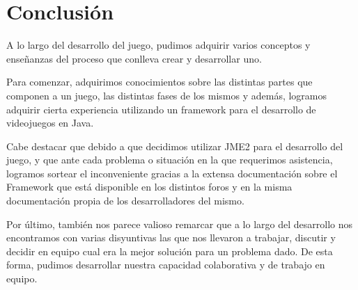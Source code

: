 \documentclass[a4paper,10pt]{article}
\begin{document}
\section{Conclusi\'on}
\label{conclusiones}

A lo largo del desarrollo del juego, pudimos adquirir varios conceptos y
ense\~nanzas del proceso que conlleva crear y desarrollar uno.

Para comenzar, adquirimos conocimientos sobre las distintas partes que componen
a un juego, las distintas fases de los mismos y adem\'as, logramos adquirir
cierta experiencia utilizando un framework para el desarrollo de videojuegos en
Java.

Cabe destacar que debido a que decidimos utilizar JME2 para el
desarrollo
del juego, y que ante cada problema o situaci\'on en la que
requerimos asistencia,
logramos
sortear el inconveniente gracias a la extensa documentaci\'on sobre el Framework
que est\'a disponible en los distintos foros y en la misma documentaci\'on
propia
de los desarrolladores del mismo.

Por \'ultimo, tambi\'en nos parece valioso remarcar que a lo largo del
desarrollo nos encontramos con varias disyuntivas las que nos llevaron a
trabajar, discutir y decidir en equipo cual era la mejor soluci\'on para un
problema dado.  De esta forma, pudimos desarrollar nuestra capacidad
colaborativa y de trabajo en equipo.
\end{document}
